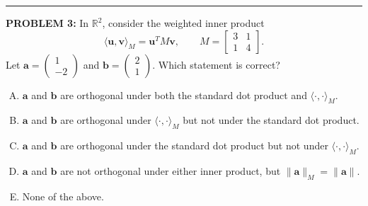 \documentclass[12pt]{amsart}
\newcommand{\divider}{
  \vspace{-1em} %
  \noindent
  \raisebox{-0.15ex}{\textbullet}%
  \hspace{0.5em}%
  \rule[0.5ex]{0.95\textwidth}{1.0pt}%
  \hspace{0.5em}%
  \raisebox{-0.15ex}{\textbullet}%
  \vspace{0em} %
}
\begin{document}
%
\divider

{\bf PROBLEM 3:}
%
In $\mathbb{R}^2$, consider the weighted inner product
$$\langle \mathbf{u}, \mathbf{v} \rangle_M = \mathbf{u}^T M \mathbf{v}, \qquad M = \begin{bmatrix} 3 & 1 \\ 1 & 4 \end{bmatrix}.$$
Let $\mathbf{a} = \begin{pmatrix} 1 \\ -2 \end{pmatrix}$ and $\mathbf{b} = \begin{pmatrix} 2 \\ 1 \end{pmatrix}$. Which statement is correct?

\begin{enumerate}[(A)]
\item $\mathbf{a}$ and $\mathbf{b}$ are orthogonal under both the standard dot product and $\langle \cdot, \cdot \rangle_M$.
\item $\mathbf{a}$ and $\mathbf{b}$ are orthogonal under $\langle \cdot, \cdot \rangle_M$ but not under the standard dot product.
\item $\mathbf{a}$ and $\mathbf{b}$ are orthogonal under the standard dot product but not under $\langle \cdot, \cdot \rangle_M$.
\item $\mathbf{a}$ and $\mathbf{b}$ are not orthogonal under either inner product, but $\|\mathbf{a}\|_M = \|\mathbf{a}\|$.
\item None of the above.
\end{enumerate}
\end{document}
